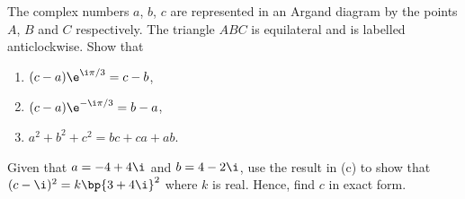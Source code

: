 \begin{problem}
    The complex numbers $a$, $b$, $c$ are represented in an Argand diagram by the points $A$, $B$ and $C$ respectively. The triangle $ABC$ is equilateral and is labelled anticlockwise. Show that
    \begin{enumerate}
        \item $(c-a) \e^{\i \pi/3} = c - b$,
        \item $(c-a) \e^{-\i \pi/3} = b - a$,
        \item $a^2 + b^2 + c^2 = bc + ca + ab$.
    \end{enumerate}
    
    Given that $a = -4 + 4\i$ and $b = 4-2\i$, use the result in (c) to show that $(c-\i)^2 = k\bp{3 + 4\i}^2$ where $k$ is real. Hence, find $c$ in exact form.
\end{problem}

